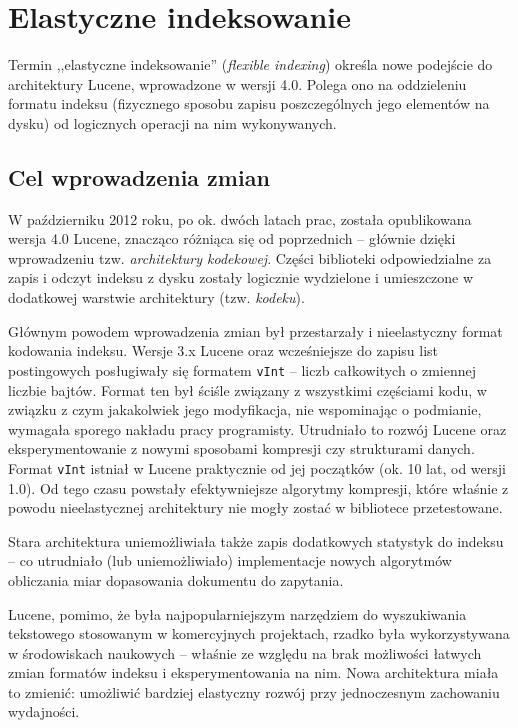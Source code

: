 \chapter{Elastyczne indeksowanie}

Termin ,,elastyczne indeksowanie'' (\emph{flexible indexing}) określa nowe podejście do architektury Lucene, wprowadzone w wersji 4.0. Polega ono na oddzieleniu formatu indeksu (fizycznego sposobu zapisu poszczególnych jego elementów na dysku) od logicznych operacji na nim wykonywanych.

\section{Cel wprowadzenia zmian}

W październiku 2012 roku, po ok. dwóch latach prac, została opublikowana wersja 4.0 Lucene, znacząco różniąca się od poprzednich -- głównie dzięki wprowadzeniu tzw. \emph{architektury kodekowej}. Części biblioteki odpowiedzialne za zapis i odczyt indeksu z dysku zostały logicznie wydzielone i umieszczone w dodatkowej warstwie architektury (tzw. \emph{kodeku}). 

Głównym powodem wprowadzenia zmian był przestarzały i nieelastyczny format kodowania indeksu. Wersje 3.x Lucene oraz wcześniejsze do zapisu list postingowych posługiwały się formatem \texttt{vInt} -- liczb całkowitych o zmiennej liczbie bajtów. Format ten był ściśle związany z wszystkimi częściami kodu, w związku z czym jakakolwiek jego modyfikacja, nie wspominając o podmianie, wymagała sporego nakładu pracy programisty. Utrudniało to rozwój Lucene oraz eksperymentowanie z nowymi sposobami kompresji czy strukturami danych. Format \texttt{vInt} istniał w Lucene praktycznie od jej początków (ok. 10 lat, od wersji 1.0). Od tego czasu powstały efektywniejsze algorytmy kompresji, które właśnie z powodu nieelastycznej architektury nie mogły zostać w bibliotece przetestowane.

Stara architektura uniemożliwiała także zapis dodatkowych statystyk do indeksu -- co utrudniało (lub uniemożliwiało) implementacje nowych algorytmów obliczania miar dopasowania dokumentu do zapytania.

Lucene, pomimo, że była najpopularniejszym narzędziem do wyszukiwania tekstowego stosowanym w komercyjnych projektach, rzadko była wykorzystywana w środowiskach naukowych -- właśnie ze względu na brak możliwości łatwych zmian formatów indeksu i eksperymentowania na nim. Nowa architektura miała to zmienić: umożliwić bardziej elastyczny rozwój przy jednoczesnym zachowaniu wydajności.

